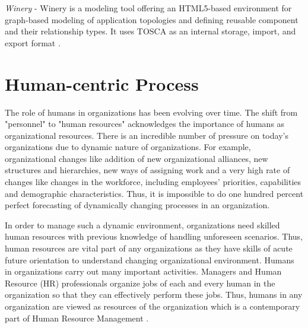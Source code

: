 \textit{Winery} - Winery is a modeling tool offering an HTML5-based environment for graph-based modeling of application topologies and defining reusable component and their relationship types. It uses TOSCA as an internal storage, import, and export format \cite{Kopp2013}. 

\section{Human-centric Process}
\label{sec:humancentric}
The role of humans in organizations has been evolving over time. The shift from "personnel" to "human resources" acknowledges the importance of humans as organizational resources. There is an incredible number of pressure on today's organizations \cite{May2016} due to dynamic nature of organizations. For example, organizational changes like addition of new organizational alliances, new structures and hierarchies, new ways of assigning work and a very high rate of changes like changes in the workforce, including employees' priorities, capabilities and demographic characteristics. Thus, it is impossible to do one hundred percent perfect forecasting of dynamically changing processes in an organization.

In order to manage such a dynamic environment, organizations need skilled human resources with previous knowledge of handling unforeseen scenarios. Thus, human resources are vital part of any organizations as they have skills of acute future orientation to understand changing organizational environment. Humans in organizations carry out many important activities. Managers and Human Resource (HR) professionals organize jobs of each and every human in the organization so that they can effectively perform these jobs. Thus, humans in any organization are viewed as resources of the organization which is a contemporary part of Human Resource Management \cite{Bianca2016}.

